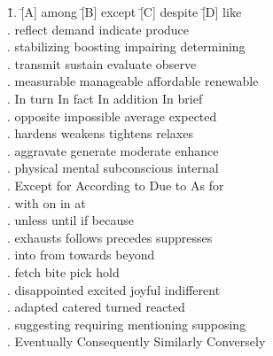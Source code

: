 \begin{tabbing}
\hspace{0cm}
\=1.  \quad\= [A] among \quad\quad\quad\quad\= [B] except \quad\quad\quad\quad\= [C] despite \quad\quad\quad\quad\= [D] like\\
.  \> [A] reflect      \> [B] demand       \> [C] indicate     \> [D] produce\\
.  \> [A] stabilizing  \> [B] boosting     \> [C] impairing    \> [D] determining\\
.  \> [A] transmit     \> [B] sustain      \> [C] evaluate     \> [D] observe\\
.  \> [A] measurable   \> [B] manageable   \> [C] affordable   \> [D] renewable\\ 
.  \> [A] In turn      \> [B] In fact      \> [C] In addition  \> [D] In brief\\
.  \> [A] opposite     \> [B] impossible   \> [C] average      \> [D] expected\\
.  \> [A] hardens      \> [B] weakens      \> [C] tightens     \> [D] relaxes\\
.  \> [A] aggravate    \> [B] generate     \> [C] moderate     \> [D] enhance\\
. \> [A] physical     \> [B] mental       \> [C] subconscious \> [D] internal\\
. \> [A] Except for   \> [B] According to \> [C] Due to       \> [D] As for\\
. \> [A] with         \> [B] on           \> [C] in           \> [D] at\\
. \> [A] unless       \> [B] until        \> [C] if           \> [D] because\\
. \> [A] exhausts     \> [B] follows      \> [C] precedes     \> [D] suppresses\\
. \> [A] into         \> [B] from         \> [C] towards      \> [D] beyond\\
. \> [A] fetch        \> [B] bite         \> [C] pick         \> [D] hold\\
. \> [A] disappointed \> [B] excited      \> [C] joyful       \> [D] indifferent\\
. \> [A] adapted      \> [B] catered      \> [C] turned       \> [D] reacted\\
. \> [A] suggesting   \> [B] requiring    \> [C] mentioning   \> [D] supposing\\
. \> [A] Eventually   \> [B] Consequently \> [C] Similarly    \> [D] Conversely
\end{tabbing}